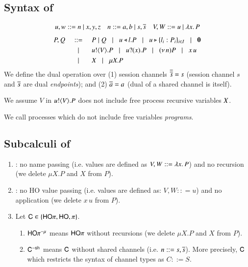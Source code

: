 \subsection{Syntax of \HOp}
\label{subsec:syntax}
\[ 
\begin{array}{lll}
u,w  ::=  n \ | \ x,y,z
& n ::= a,b  \ | \ s, \overline{s} 
& V,W  ::=   u \ | \ \lambda x.\,P
\end{array}
\]
\[
\begin{array}{rclllll}
P,Q & ::= &  P\;|\; Q \;\;\;|\;\;\; 
 u \triangleleft l . P \;\;\;|\;\;\; u \triangleright \{l_i:P_i\}_{i \in I} \;\;\;|\;\;\; \mathbf{0} \\[1mm]
 & \;\;\;|\;\;\; & u ! \langle V \rangle .{P} \;\;\;|\;\;\; u ? (x) .{P} \;\;\;|\;\;\; (\nu\, n) P 
\;\;\;|\;\;\; x\, {u} 
\\[1mm]
     & \;\;\;|\;\;\; & X \;\;\;|\;\;\; \mu X. P
\end{array}
\]
We define the dual operation over (1) session channels $\overline{\overline{s}} = s$
(session channel $s$ and $\overline{s}$ are dual \emph{endpoints}); and 
(2) $\overline{a} = a$ (dual of a shared channel is itself).  

We assume $V$ in $u ! \langle V \rangle .{P}$ does not include free process recursive 
variables $X$. 

We call processes which do not include free variables {\em programs}.

\subsection{Subcalculi of \HOp}
\label{subsec:subcalculi}
\begin{enumerate}[$\bullet$]
\item \HO: no name passing 
(i.e. values are defined as $V,W :: = \lambda x.\,P$)
and no recursion (we delete $\mu X.P$ and $X$ from $P$).   
\item \sessp: no HO value passing (i.e. 
values are defined as:
$V,W :: = u$) and no application (we delete $x\, u$ from $P$). 
\item Let $\mathsf{C} \in \{\mathsf{HO}\pi, \mathsf{HO}, \pi\}$. 
\begin{enumerate}[-]
\item $\mathsf{HO}\pi^{-\mu}$ means 
$\mathsf{HO}\pi$ without recursions (we delete $\mu X.P$ and $X$ from $P$).   
\item 
$\mathsf{C}^{-\mathsf{sh}}$ means $\mathsf{C}$ without shared channels (i.e. 
$n ::= s, \overline{s}$). More precisely, $\mathsf{C}$ which restricts 
the syntax of channel types as $C::= S$.  
\end{enumerate}
\end{enumerate}

